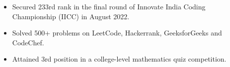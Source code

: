 \documentclass[letterpaper,11pt]{article}
\newcommand{\resumeItem}[1]{
  \item\small{
    {#1 \vspace{-2pt}}
  }
}
\newcommand{\resumeItemListStart}{\begin{itemize}}
\newcommand{\resumeItemListEnd}{\end{itemize}\vspace{-5pt}}
\newcommand\sbullet[1][.5]{\mathbin{\vcenter{\hbox{\scalebox{#1}{$\bullet$}}}}}
\begin{document}
\vspace{0pt}
    \resumeItemListStart
         
         \resumeItem{\normalsize{Secured 233rd rank in the final round of Innovate India Coding Championship (IICC) in August 2022.}}
         \resumeItem{\normalsize{Solved 500+ problems on LeetCode, Hackerrank, GeeksforGeeks and CodeChef.}}
            \resumeItem{\normalsize{Attained 3rd position in a college-level mathematics quiz competition.}}
    \resumeItemListEnd


         
         
\end{document}
